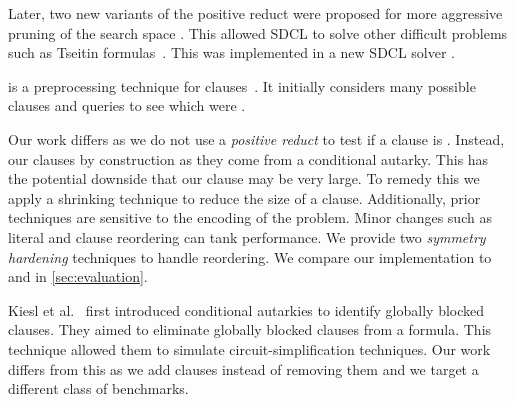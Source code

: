 Later, two new variants of the positive reduct were proposed for more aggressive pruning of the search space \cite{sadical}. This allowed SDCL to solve other difficult problems such as Tseitin formulas~\cite{hardexamplesresolution}. This was implemented in a new SDCL solver \sadical.


\prelearn is a preprocessing technique for \pr clauses~\cite{prelearn}. It initially considers many possible clauses and queries \sadical to see which were \pr.

Our work differs as we do not use a \emph{positive reduct} to test if a clause
is \pr. Instead, our clauses \pr by construction as they come from a conditional
autarky. This has the potential downside that our clause may be very large. To
remedy this we apply a shrinking technique to reduce the size of a clause.
Additionally, prior techniques are sensitive to the encoding of the problem.
Minor changes such as literal and clause reordering can tank performance. We
provide two \emph{symmetry hardening} techniques to handle reordering. We
compare our implementation \tool to \sadical and \prelearn in
\autoref{sec:evaluation}.

Kiesl et al.~\cite{conditionalautarkies} first introduced conditional autarkies to identify globally blocked clauses. They aimed to eliminate globally blocked clauses from a formula. This technique allowed them to simulate circuit-simplification techniques. Our work differs from this as we add clauses instead of removing them and we target a different class of benchmarks.
